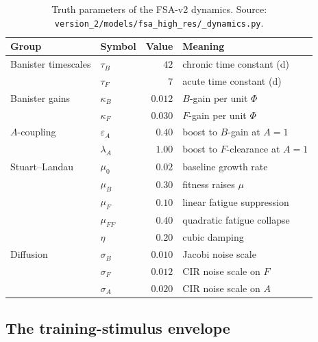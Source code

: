 \begin{table}[h]
\centering
\small
\begin{tabular}{@{}llrl@{}}
\toprule
Group & Symbol & Value & Meaning \\
\midrule
Banister timescales       & $\tau_B$              & $42$       & chronic time constant (d) \\
                          & $\tau_F$              & $7$        & acute time constant (d) \\
Banister gains            & $\kappa_B$            & $0.012$    & $B$-gain per unit $\Phi$ \\
                          & $\kappa_F$            & $0.030$    & $F$-gain per unit $\Phi$ \\
$A$-coupling              & $\varepsilon_A$       & $0.40$     & boost to $B$-gain at $A=1$ \\
                          & $\lambda_A$           & $1.00$     & boost to $F$-clearance at $A=1$ \\
Stuart--Landau            & $\mu_0$               & $0.02$     & baseline growth rate \\
                          & $\mu_B$               & $0.30$     & fitness raises $\mu$ \\
                          & $\mu_F$               & $0.10$     & linear fatigue suppression \\
                          & $\mu_{FF}$            & $0.40$     & quadratic fatigue collapse \\
                          & $\eta$                & $0.20$     & cubic damping \\
Diffusion                 & $\sigma_B$            & $0.010$    & Jacobi noise scale \\
                          & $\sigma_F$            & $0.012$    & CIR noise scale on $F$ \\
                          & $\sigma_A$            & $0.020$    & CIR noise scale on $A$ \\
\bottomrule
\end{tabular}
\caption{Truth parameters of the FSA-v2 dynamics. Source:
\texttt{version\_2/models/fsa\_high\_res/\_dynamics.py}.}
\label{tab:fsa-truth}
\end{table}

\subsection{The training-stimulus envelope}

